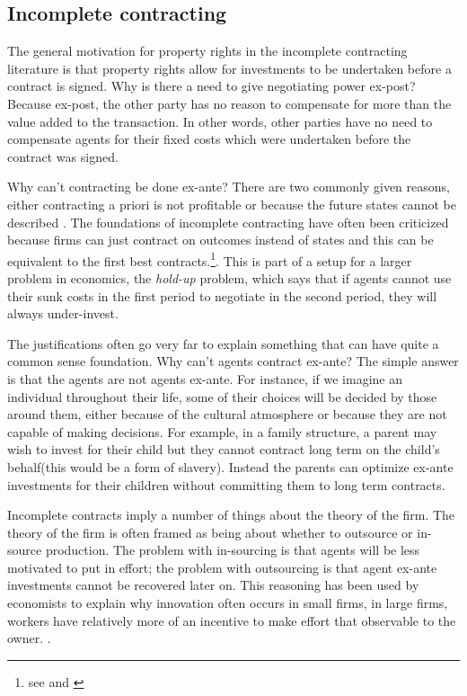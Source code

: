 \documentclass[12pt]{article}
\numberwithin{equation}{section}
\begin{document}
\subsection{Incomplete contracting}

The general motivation for property rights in the incomplete contracting literature is that property rights allow for investments to be undertaken before a contract is signed. Why is there a need to give negotiating power ex-post? Because ex-post, the other party has no reason to compensate for more than the value added to the transaction. In other words, other parties have no need to compensate agents for their fixed costs which were undertaken before the contract was signed.

Why can't contracting be done ex-ante? There are two commonly given reasons, either contracting a priori is not profitable or because the future states cannot be described \cite{Hart1999}. The foundations of incomplete contracting have often been criticized because firms can just contract on outcomes instead of states and this can be equivalent to the first best contracts.\footnote{see \cite{Maskin2002} and \cite{maskin1999unforeseen}}. This is part of a setup for a larger problem in economics, the \textit{hold-up} problem, which says that if agents cannot use their sunk costs in the first period to negotiate in the second period, they will always under-invest.

The justifications often go very far to explain something that can have quite a common sense foundation. Why can't agents contract ex-ante? The simple answer is that the agents are not agents ex-ante. For instance, if we imagine an individual throughout their life, some of their choices will be decided by those around them, either because of the cultural atmosphere or because they are not capable of making decisions. For example, in a family structure, a parent may wish to invest for their child but they cannot contract long term on the child's behalf(this would be a form of slavery). Instead the parents can optimize ex-ante investments for their children without committing them to long term contracts.

Incomplete contracts imply a number of things about the theory of the firm. The theory of the firm is often framed as being about whether to outsource or in-source production. The problem with in-sourcing is that agents will be less motivated to put in effort; the problem with outsourcing is that agent ex-ante investments cannot be recovered later on. This reasoning has been used by economists to explain why innovation often occurs in small firms, in large firms, workers have relatively more of an incentive to make effort that observable to the owner. \cite{Holmstrom1989}.
\end{document}
